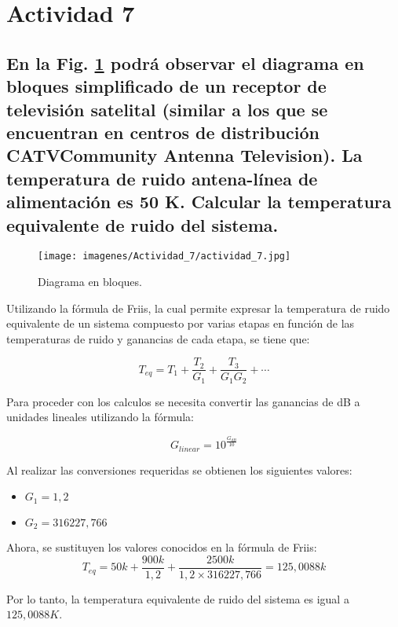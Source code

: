 \section{Actividad 7}

\subsection*{En la Fig. \ref{fig:diagrama} podrá observar el diagrama en bloques simplificado de un receptor de televisión satelital 
(similar a los que se encuentran en centros de distribución CATVCommunity Antenna Television). La temperatura de ruido antena-línea 
de alimentación es 50 K. Calcular la temperatura equivalente de ruido del sistema.}

    \begin{figure}[H]
            \centering
            \texttt{[image: imagenes/Actividad\_7/actividad\_7.jpg]}
            \caption{Diagrama en bloques.}
            \label{fig:diagrama}
    \end{figure}

    Utilizando la fórmula de Friis, la cual permite expresar la temperatura de ruido equivalente de un sistema compuesto por varias etapas en función de las 
    temperaturas de ruido y ganancias de cada etapa, se tiene que:
        
        \[
            T_{eq} = T_1 + \frac{T_2}{G_1} + \frac{T_3}{G_1 G_2} + \cdots           
        \]
    
    Para proceder con los calculos se necesita convertir las ganancias de dB a unidades lineales utilizando la fórmula:
    
        \[
            G_{linear} = 10^{\frac{G_{dB}}{10}}
        \]
    
    Al realizar las conversiones requeridas se obtienen los siguientes valores:
        \begin{itemize}
            \item $G_1 = 1,2$
            \item $G_2 = 316227,766$
        \end{itemize}

    Ahora, se sustituyen los valores conocidos en la fórmula de Friis:
        \[
            T_{eq} = 50 k + \frac{900 k }{1,2} + \frac{2500 k }{1,2 \times 316227,766} = 125,0088 k
        \]

    Por lo tanto, la temperatura equivalente de ruido del sistema es igual a $125,0088 K$.
